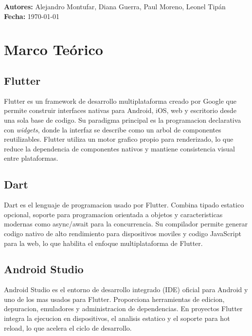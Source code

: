 \documentclass[12pt, a4paper]{article}
\begin{document}
\begin{titlepage}
\vfill
\begin{tcolorbox}[
    enhanced,
    width=\linewidth,
    colback=black!3,
    colframe=black!20,
    boxrule=0.5pt,
    arc=4pt,
    left=12pt,
    right=12pt,
    top=10pt,
    bottom=10pt
]
\color{black}
\textbf{Autores:} Alejandro Montufar, Diana Guerra, Paul Moreno, Leonel Tipán\\[4pt]
\textbf{Fecha:} \today
\end{tcolorbox}
\end{titlepage}

\tableofcontents
\newpage

\section{Marco Teórico}

\subsection{Flutter}
Flutter es un framework de desarrollo multiplataforma creado por Google que permite construir interfaces nativas para Android, iOS, web y escritorio desde una sola base de codigo. Su paradigma principal es la programacion declarativa con \textit{widgets}, donde la interfaz se describe como un arbol de componentes reutilizables. Flutter utiliza un motor grafico propio para renderizado, lo que reduce la dependencia de componentes nativos y mantiene consistencia visual entre plataformas.

\subsection{Dart}
Dart es el lenguaje de programacion usado por Flutter. Combina tipado estatico opcional, soporte para programacion orientada a objetos y caracteristicas modernas como async/await para la concurrencia. Su compilador permite generar codigo nativo de alto rendimiento para dispositivos moviles y codigo JavaScript para la web, lo que habilita el enfoque multiplataforma de Flutter.

\subsection{Android Studio}
Android Studio es el entorno de desarrollo integrado (IDE) oficial para Android y uno de los mas usados para Flutter. Proporciona herramientas de edicion, depuracion, emuladores y administracion de dependencias. En proyectos Flutter integra la ejecucion en dispositivos, el analisis estatico y el soporte para hot reload, lo que acelera el ciclo de desarrollo.
\end{document}
